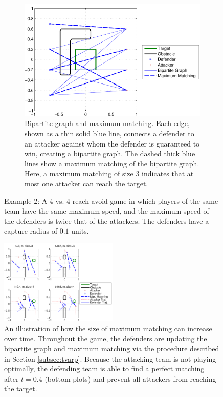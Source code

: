 \begin{figure}
	\ContinuedFloat
	\centering
	\begin{subfigure}{0.4\textwidth}
	\centering
	\includegraphics[width=\textwidth]{"fig/max matching 2"}
	\caption{Bipartite graph and maximum matching. Each edge, shown as a thin solid blue line, connects a defender to an attacker against whom the defender is guaranteed to win, creating a bipartite graph. The dashed thick blue lines show a maximum matching of the bipartite graph. Here, a maximum matching of size 3 indicates that at most one attacker can reach the target.}
	\label{subfig:max_matching_2}
	\end{subfigure}
\caption{Example 2: A 4 vs. 4 reach-avoid game in which players of the same team have the same maximum speed, and the maximum speed of the defenders is twice that of the attackers.  The defenders have a capture radius of $0.1$ units.}
\label{fig:results2}
\end{figure}

\begin{figure}[H]
\centering
\includegraphics[width=0.5\textwidth]{"fig/time varying graph"}
\caption{An illustration of how the size of maximum matching can increase over time. Throughout the game, the defenders are updating the bipartite graph and maximum matching via the procedure described in Section \ref{subsec:tvarp}. Because the attacking team is not playing optimally, the defending team is able to find a perfect matching after $t=0.4$ (bottom plots) and prevent all attackers from reaching the target.}
\label{fig:tvarg}
\end{figure}